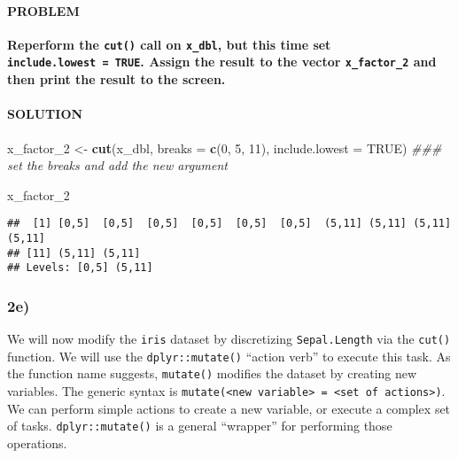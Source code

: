 \documentclass[]{article}
\newenvironment{Shaded}{\begin{snugshade}}{\end{snugshade}}
\newcommand{\CommentTok}[1]{\textcolor[rgb]{0.56,0.35,0.01}{\textit{#1}}}
\newcommand{\DataTypeTok}[1]{\textcolor[rgb]{0.13,0.29,0.53}{#1}}
\newcommand{\DecValTok}[1]{\textcolor[rgb]{0.00,0.00,0.81}{#1}}
\newcommand{\KeywordTok}[1]{\textcolor[rgb]{0.13,0.29,0.53}{\textbf{#1}}}
\newcommand{\NormalTok}[1]{#1}
\newcommand{\OtherTok}[1]{\textcolor[rgb]{0.56,0.35,0.01}{#1}}
\newcommand{\StringTok}[1]{\textcolor[rgb]{0.31,0.60,0.02}{#1}}
\let\oldparagraph\paragraph
\renewcommand{\paragraph}[1]{\oldparagraph{#1}\mbox{}}
\begin{document}
\hypertarget{problem-9}{%
\paragraph{PROBLEM}\label{problem-9}}

\textbf{Reperform the \texttt{cut()} call on \texttt{x\_dbl}, but this
time set \texttt{include.lowest\ =\ TRUE}. Assign the result to the
vector \texttt{x\_factor\_2} and then print the result to the screen.}

\hypertarget{solution-8}{%
\paragraph{SOLUTION}\label{solution-8}}

\begin{Shaded}
\begin{Highlighting}[]
\NormalTok{x_factor_}\DecValTok{2}\NormalTok{ <-}\StringTok{ }\KeywordTok{cut}\NormalTok{(x_dbl, }\DataTypeTok{breaks =} \KeywordTok{c}\NormalTok{(}\DecValTok{0}\NormalTok{, }\DecValTok{5}\NormalTok{, }\DecValTok{11}\NormalTok{), }\DataTypeTok{include.lowest =} \OtherTok{TRUE}\NormalTok{) }\CommentTok{### set the breaks and add the new argument}

\NormalTok{x_factor_}\DecValTok{2}
\end{Highlighting}
\end{Shaded}

\begin{verbatim}
##  [1] [0,5]  [0,5]  [0,5]  [0,5]  [0,5]  [0,5]  (5,11] (5,11] (5,11] (5,11]
## [11] (5,11] (5,11]
## Levels: [0,5] (5,11]
\end{verbatim}

\hypertarget{e-1}{%
\subsubsection{2e)}\label{e-1}}

We will now modify the \texttt{iris} dataset by discretizing
\texttt{Sepal.Length} via the \texttt{cut()} function. We will use the
\texttt{dplyr::mutate()} ``action verb'' to execute this task. As the
function name suggests, \texttt{mutate()} modifies the dataset by
creating new variables. The generic syntax is
\texttt{mutate(\textless{}new\ variable\textgreater{}\ =\ \textless{}set\ of\ actions\textgreater{})}.
We can perform simple actions to create a new variable, or execute a
complex set of tasks. \texttt{dplyr::mutate()} is a general ``wrapper''
for performing those operations.
\end{document}
